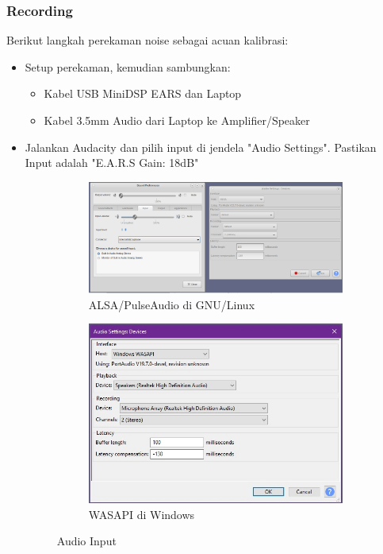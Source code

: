 \documentclass{article}
\begin{document}
	\subsubsection{Recording}

	Berikut langkah perekaman noise sebagai acuan kalibrasi:

	\begin{itemize}
		\item Setup perekaman, kemudian sambungkan:
		\begin{itemize}
			\item Kabel USB MiniDSP EARS dan Laptop
			\item Kabel 3.5mm Audio dari Laptop ke Amplifier/Speaker
		\end{itemize}

		\item Jalankan Audacity dan pilih input di jendela "Audio Settings".
		Pastikan Input adalah "E.A.R.S Gain: 18dB"

		\begin{figure}[H]
			\centering
			\begin{subfigure}[]{.55\textwidth}
				\includegraphics[width=\textwidth]{images/audacity_in_linux}
				\caption{ALSA/PulseAudio di GNU/Linux}
			\end{subfigure}
			\begin{subfigure}[]{.35\textwidth}
				\includegraphics[width=\textwidth]{images/audacity_in_windows}
				\caption{WASAPI di Windows}
			\end{subfigure}
			\caption{Audio Input}
		\end{figure}


\end{itemize}
\end{document}
